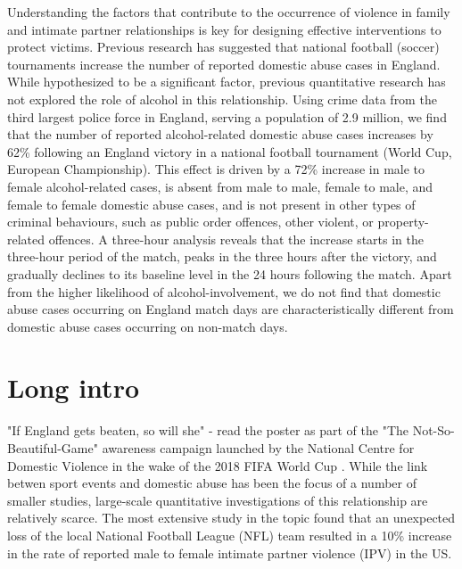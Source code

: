 \documentclass[12pt, letterpaper]{article}
\begin{document}
Understanding the factors that contribute to the occurrence of violence in family and intimate partner relationships is key for designing effective interventions to protect victims. Previous research has suggested that national football (soccer) tournaments increase the number of reported domestic abuse cases in England\autocite{Kirby2014, Brimicombe2012}. While hypothesized to be a significant factor, previous quantitative research has not explored the role of alcohol in this relationship. Using crime data from the third largest police force in England, serving a population of 2.9 million\autocite{populationfigure}, we find that the number of reported alcohol-related domestic abuse cases increases by 62\% following an England victory in a national football tournament (World Cup, European Championship). This effect is driven by a 72\% increase in male to female alcohol-related cases, is absent from male to male, female to male, and female to female domestic abuse cases, and is not present in other types of criminal behaviours, such as public order offences, other violent, or property-related offences. A three-hour analysis reveals that the increase starts in the three-hour period of the match, peaks in the three hours after the victory, and gradually declines to its baseline level in the 24 hours following the match. Apart from the higher likelihood of alcohol-involvement, we do not find that domestic abuse cases occurring on England match days are characteristically different from domestic abuse cases occurring on non-match days.


\section{Long intro}

"If England gets beaten, so will she" - read the poster as part of the "The Not-So-Beautiful-Game" awareness campaign launched by the National Centre for Domestic Violence in the wake of the 2018 FIFA World Cup \autocite{NCDV}. While the link betwen sport events and domestic abuse has been the focus of a number of smaller studies\autocite{Williams2014}, large-scale quantitative investigations of this relationship are relatively scarce. The most extensive study in the topic found that an unexpected loss of the local National Football League (NFL) team resulted in a 10\% increase in the rate of reported male to female intimate partner violence (IPV) in the US\autocite{Card2011}. 
\end{document}
